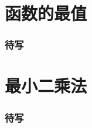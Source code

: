 \section{函数的最值}


\begin{frame}
\frametitle{待写}

\end{frame}


\section{最小二乘法}


\begin{frame}
\frametitle{待写}

\end{frame}



